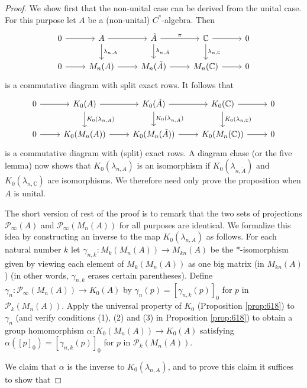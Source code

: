 \documentclass{book}
\def\cstar{\(C^*\)-algebra}
\begin{document}
\begin{proof}
  We show first that the non-unital case can be derived from the unital case.
  For this purpose let \(A\) be a (non-unital) \cstar. Then
  \[
    \begin{tikzcd}
      0\arrow[r]&A\arrow[r]\arrow[d,"\lambda_{n,A}"]&\tilde{A}\arrow[r,"\pi"]\arrow[d,"\lambda_{n,\tilde{A}}"]&\mathbb{C}\arrow[r]\arrow[d,"\lambda_{n,\mathbb{C}}"]&0\\
      0\arrow[r]&M_n(A)\arrow[r]&M_n(\tilde{A})\arrow[r]&M_n(\mathbb{C})\arrow[r]&0
    \end{tikzcd}
  \]
  is a commutative diagram with split exact rows. It follows that
  \[
    \begin{tikzcd}
      0\arrow[r]&K_0(A)\arrow[r]\arrow[d,"K_0(\lambda_{n,A})"]&K_0(\tilde{A})\arrow[r]\arrow[d,"K_0(\lambda_{n,\tilde{A}})"]&K_0(\mathbb{C})\arrow[r]\arrow[d,"K_0(\lambda_{n,\mathbb{C}})"]&0\\
      0\arrow[r]&K_0(M_n(A))\arrow[r]&K_0(M_n(\tilde{A}))\arrow[r]&K_0(M_n(\mathbb{C}))\arrow[r]&0
    \end{tikzcd}
  \]
  is a commutative diagram with (split) exact rows. A diagram chase (or the five lemma) now shows that 
  \(K_0(\lambda_{n,A})\) is an isomorphism if \(K_0(\lambda_{n,\tilde{A}})\) and \(K_0(\lambda_{n,\mathbb{C}})\)
  are isomorphisms. We therefore need only prove the proposition when \(A\) is unital.\par
  The short version of rest of the proof is to remark that the two sets of projections 
  \(\mathcal{P}_\infty(A)\) and \(\mathcal{P}_\infty(M_n(A))\) for all purposes are identical.
  We formalize this idea by constructing an inverse to the map \(K_0(\lambda_{n,A})\) as follows.
  For each natural number \(k\) let \(\gamma_{n,k}:M_k(M_n(A))\to M_{kn}(A)\) be the *-isomorphism
  given by viewing each element of \(M_k(M_n(A))\) as one big matrix (in \(M_{kn}(A)\)) (in other words, \(\gamma_{n,k}\) erases certain parentheses).
  Define \(\gamma_n:\mathcal{P}_\infty(M_n(A))\to K_0(A)\) by \(\gamma_n(p)={[\gamma_{n,k}(p)]}_0\)
  for \(p\) in \(\mathcal{P}_k(M_n(A))\). Apply the universal property of \(K_0\) (Proposition \ref{prop:618}) to \(\gamma_n\)
  (and verify conditions (1), (2) and (3) in Proposition \ref{prop:618}) to obtain a group homomorphism
  \(\alpha:K_0(M_n(A))\to K_0(A)\) satisfying \(\alpha({[p]}_0)={[\gamma_{n,k}(p)]}_0\) for \(p\)
  in \(\mathcal{P}_k(M_n(A))\).\par
  We claim that \(\alpha\) is the inverse to \(K_0(\lambda_{n,A})\), and to prove this claim it suffices to show that

\end{proof}
\end{document}
